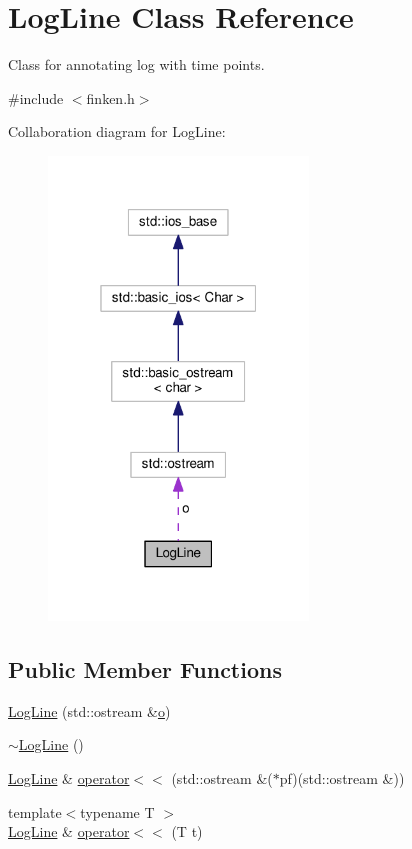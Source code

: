 \hypertarget{classLogLine}{}\section{Log\+Line Class Reference}
\label{classLogLine}


Class for annotating log with time points.  




{\ttfamily \#include $<$finken.\+h$>$}



Collaboration diagram for Log\+Line\+:\nopagebreak
\begin{figure}[H]
\begin{center}
\leavevmode
\includegraphics[width=196pt]{classLogLine__coll__graph}
\end{center}
\end{figure}
\subsection*{Public Member Functions}
\begin{DoxyCompactItemize}
\item 
\hyperlink{classLogLine_a7f1c876fef642fffb06f646749662a04}{Log\+Line} (std\+::ostream \&\hyperlink{classLogLine_aa968a7a5fadffd96309f7c18f8a1243a}{o})
\item 
\hyperlink{classLogLine_a8f1fb7b3c7efbe280d426108caff22aa}{$\sim$\+Log\+Line} ()
\item 
\hyperlink{classLogLine}{Log\+Line} \& \hyperlink{classLogLine_a9697d8126ee9dd2ee3ea70bc61abf4b8}{operator$<$$<$} (std\+::ostream \&($\ast$pf)(std\+::ostream \&))
\item 
{\footnotesize template$<$typename T $>$ }\\\hyperlink{classLogLine}{Log\+Line} \& \hyperlink{classLogLine_aa9dff12f0c1466e53e63f981872f1e76}{operator$<$$<$} (T t)
\end{DoxyCompactItemize}
